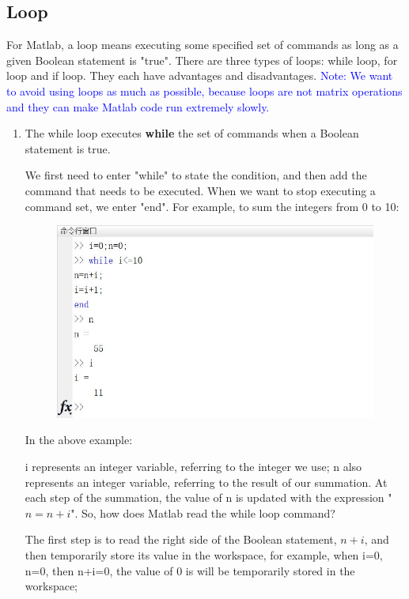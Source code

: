 \documentclass[10pt,math=newtx,citestyle=gb7714-2015,bibstyle=gb7714-2015]{elegantbook}
\begin{document}
{{{	\subsection{Loop}
	
	For Matlab, a loop means executing some specified set of commands as long as a given Boolean statement is "true". There are three types of loops: while loop, for loop and if loop. They each have advantages and disadvantages. \textcolor{blue}{Note: We want to avoid using loops as much as possible, because loops are not matrix operations and they can make Matlab code run extremely slowly. }
	
	\begin{enumerate}
		\item The while loop executes \textbf{while} the set of commands when a Boolean statement is true.
		
		We first need to enter "while" to state the condition, and then add the command that needs to be executed. When we want to stop executing a command set, we enter "end". For example, to sum the integers from 0 to 10:
		
		\begin{figure}[htbp!]
			\centering
			\includegraphics[width=0.8\linewidth]{FIG/integersum}
			\centering
		\end{figure}
		
		In the above example:
		
		i represents an integer variable, referring to the integer we use; n also represents an integer variable, referring to the result of our summation. At each step of the summation, the value of n is updated with the expression "$n=n+i$". So, how does Matlab read the while loop command?
		
		The first step is to read the right side of the Boolean statement, $n+i$, and then temporarily store its value in the workspace, for example, when i=0, n=0, then n+i=0, the value of 0 is will be temporarily stored in the workspace;
		

\end{enumerate}}}}
\end{document}
